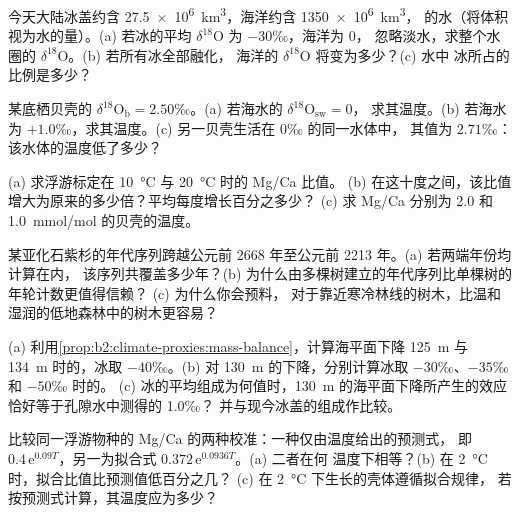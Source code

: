 \begin{exercise}[$\star$]\label{exo:b2:climate-proxies:1}
今天大陆冰盖约含 \qty{27.5e6}{km^3}，海洋约含 \qty{1350e6}{km^3}，
的水（将体积视为水的量）。(a) 若冰的平均 $\delta^{18}$O 为 $-30$‰，海洋为 0，
忽略淡水，求整个水圈的 $\delta^{18}$O。(b) 若所有冰全部融化，
海洋的 $\delta^{18}$O 将变为多少？(c) 水中
冰所占的比例是多少？
\end{exercise}

\begin{exercise}[$\star$]\label{exo:b2:climate-proxies:2}
某底栖贝壳的 $\delta^{18}\mathrm{O}_{\mathrm{b}} = 2.50$‰。(a) 若海水的 $\delta^{18}\mathrm{O}_{\mathrm{sw}} = 0$，
求其温度。(b) 若海水为 $+1.0$‰，求其温度。(c) 另一贝壳生活在 $0$‰ 的同一水体中，
其值为
$2.71$‰：该水体的温度低了多少？
\end{exercise}

\begin{exercise}[$\star$]\label{exo:b2:climate-proxies:3}
(a) 求浮游标定在 \qty{10}{\celsius} 与 \qty{20}{\celsius} 时的 Mg/Ca 比值。
(b) 在这十度之间，该比值增大为原来的多少倍？平均每度增长百分之多少？
(c) 求 Mg/Ca 分别为 2.0 和
\qty{1.0}{mmol/mol} 的贝壳的温度。
\end{exercise}

\begin{exercise}[$\star$]\label{exo:b2:climate-proxies:4}
某亚化石紫杉的年代序列跨越公元前 2668 年至公元前 2213 年。(a) 若两端年份均计算在内，
该序列共覆盖多少年？(b) 为什么由多棵树建立的年代序列比单棵树的年轮计数更值得信赖？
(c) 为什么你会预料，
对于靠近寒冷林线的树木，比温和湿润的低地森林中的树木更容易？
\end{exercise}

\begin{exercise}[$\star\star$]\label{exo:b2:climate-proxies:5}
(a) 利用\cref{prop:b2:climate-proxies:mass-balance}，计算海平面下降 \qty{125}{m} 与
\qty{134}{m} 时的，冰取 $-40$‰。(b) 对
\qty{130}{m} 的下降，分别计算冰取 $-30$‰、$-35$‰ 和 $-50$‰ 时的。
(c) 冰的平均组成为何值时，\qty{130}{m} 的海平面下降所产生的效应恰好等于孔隙水中测得的 \num{1.0}‰？
并与现今冰盖的组成作比较。
\end{exercise}

\begin{exercise}[$\star\star$]\label{exo:b2:climate-proxies:6}
比较同一浮游物种的 Mg/Ca 的两种校准：一种仅由温度给出的预测式，
即 $0.4\,\mathrm{e}^{0.09T}$，另一为拟合式 $0.372\,\mathrm{e}^{0.0936T}$。(a) 二者在何
温度下相等？(b) 在 \qty{2}{\celsius} 时，拟合比值比预测值低百分之几？
(c) 在 \qty{2}{\celsius} 下生长的壳体遵循拟合规律，
若按预测式计算，其温度应为多少？
\end{exercise}

